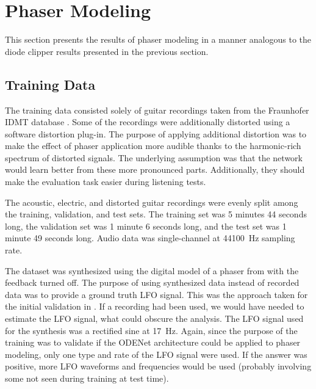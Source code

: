 \section{Phaser Modeling}

This section presents the results of phaser modeling in a manner analogous to the diode clipper results presented in the previous section.

\subsection{Training Data}
\label{sec:phaser_training_data}

The training data consisted solely of guitar recordings taken from the Fraunhofer IDMT database \cite{Kehling2014}. Some of the recordings were additionally distorted using a software distortion plug-in. The purpose of applying additional distortion was to make the effect of phaser application more audible thanks to the harmonic-rich spectrum of distorted signals. The underlying assumption was that the network would learn better from these more pronounced parts. Additionally, they should make the evaluation task easier during listening tests. 

The acoustic, electric, and distorted guitar recordings were evenly split among the training, validation, and test sets. The training set was 5 minutes 44 seconds long, the validation set was 1 minute 6 seconds long, and the test set was 1 minute 49 seconds long. Audio data was single-channel at \SI{44100}{Hz} sampling rate.

The dataset was synthesized using the digital model of a phaser from \cite{Kiiski2016} with the feedback turned off. The purpose of using synthesized data instead of recorded data was to provide a ground truth LFO signal. This was the approach taken for the initial validation in \cite{Wright2020}. If a recording had been used, we would have needed to estimate the LFO signal, what could obscure the analysis. The LFO signal used for the synthesis was a rectified sine at \SI{17}{Hz}. Again, since the purpose of the training was to validate if the ODENet architecture could be applied to phaser modeling, only one type and rate of the LFO signal were used. If the answer was positive, more LFO waveforms and frequencies would be used (probably involving some not seen during training at test time). 

